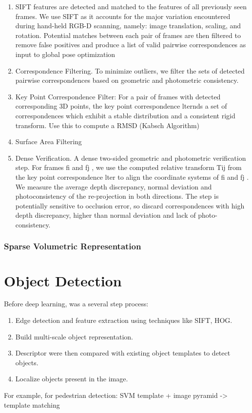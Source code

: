\begin{enumerate}
\item SIFT features are detected and matched to the features of all previously seen frames. We use SIFT as it accounts for the major variation encountered during hand-held RGB-D scanning, namely: image translation, scaling, and rotation. Potential matches between each pair of frames are then filtered to remove false positives and produce a list of valid pairwise correspondences as input to global pose optimization
%
\item Correspondence Filtering. To minimize outliers, we filter the sets of detected pairwise correspondences based on geometric and photometric consistency.
%
\item Key Point Correspondence Filter: For a pair of frames with detected corresponding 3D points, the key point correspondence  lternds a set of correspondences which exhibit a stable distribution and a consistent rigid transform. Use this to compute a RMSD (Kabsch Algorithm)
%
\item Surface Area Filtering
%
\item Dense Verification. A dense two-sided geometric and photometric verification step. For frames fi and fj , we use the computed relative transform Tij from the key point correspondence lter to align the coordinate systems of fi and fj . We measure the average depth discrepancy, normal deviation and photoconsistency of the re-projection in both directions. The step is potentially sensitive to occlusion error, so discard correspondences with high depth discrepancy, higher than normal deviation and lack of photo-consistency.
\end{enumerate}

\subsubsection{Sparse Volumetric Representation}

\section{Object Detection}
Before deep learning, was a several step process: 
\begin{enumerate}
\item Edge detection and feature extraction using techniques like SIFT, HOG.
\item Build multi-scale object representation.
\item Descriptor were then compared with existing object templates to detect objects.
\item Localize objects present in the image.
\end{enumerate}
For example, for pedestrian detection: SVM template + image pyramid -> template matching

